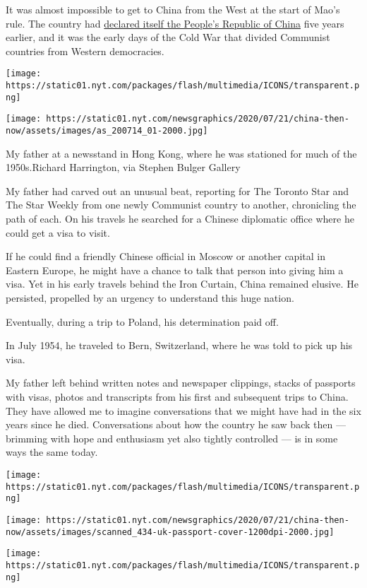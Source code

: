 It was almost impossible to get to China from the West at the start of
Mao's rule. The country had
\href{https://archive.nytimes.com/www.nytimes.com/library/world/asia/100149mao-communism.html}{declared
itself the People's Republic of China} five years earlier, and it was
the early days of the Cold War that divided Communist countries from
Western democracies.

\texttt{[image: https://static01.nyt.com/packages/flash/multimedia/ICONS/transparent.png]}

\texttt{[image: https://static01.nyt.com/newsgraphics/2020/07/21/china-then-now/assets/images/as\_200714\_01-2000.jpg]}

My father at a newsstand in Hong Kong, where he was stationed for much
of the 1950s.Richard Harrington, via Stephen Bulger Gallery

My father had carved out an unusual beat, reporting for The Toronto Star
and The Star Weekly from one newly Communist country to another,
chronicling the path of each. On his travels he searched for a Chinese
diplomatic office where he could get a visa to visit.

If he could find a friendly Chinese official in Moscow or another
capital in Eastern Europe, he might have a chance to talk that person
into giving him a visa. Yet in his early travels behind the Iron
Curtain, China remained elusive. He persisted, propelled by an urgency
to understand this huge nation.

Eventually, during a trip to Poland, his determination paid off.

In July 1954, he traveled to Bern, Switzerland, where he was told to
pick up his visa.

My father left behind written notes and newspaper clippings, stacks of
passports with visas, photos and transcripts from his first and
subsequent trips to China. They have allowed me to imagine conversations
that we might have had in the six years since he died. Conversations
about how the country he saw back then --- brimming with hope and
enthusiasm yet also tightly controlled --- is in some ways the same
today.

\texttt{[image: https://static01.nyt.com/packages/flash/multimedia/ICONS/transparent.png]}

\texttt{[image: https://static01.nyt.com/newsgraphics/2020/07/21/china-then-now/assets/images/scanned\_434-uk-passport-cover-1200dpi-2000.jpg]}

\texttt{[image: https://static01.nyt.com/packages/flash/multimedia/ICONS/transparent.png]}

